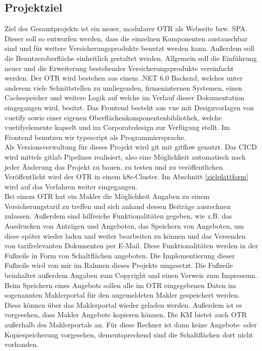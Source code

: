 \subsection{Projektziel}
\label{projektziel}
Ziel des Gesamtprojekts ist ein neuer, modularer \ac{OTR} als Webseite bzw. \ac{SPA}. Dieser soll so entworfen werden, dass die einzelnen Komponenten austauschbar sind und für weitere Versicherungsprodukte benutzt werden kann. Außerdem soll die Benutzeroberfläche einheitlich gestaltet werden. Allgemein soll die Einführung neuer und die Erweiterung bestehender Versicherungsprodukte vereinfacht werden. Der \ac{OTR} wird bestehen aus einem .NET 6.0 Backend, welches unter anderem viele Schnittstellen zu umliegenden, firmeninternen Systemen, einen Cachespeicher und weitere Logik auf welche im Verlauf dieser Dokumentation eingegangen wird, besitzt. Das Frontend besteht aus \gls{vue} mit Designvorlagen von \gls{vuetify} sowie einer eigenen Oberflächenkomponentenbibliothek, welche \gls{vuetify}elemente kapselt und im Corporatedesign zur Verfügung stellt. Im Frontend benutzen wir \gls{typescript} als Programmiersprache.\\
Als Versionsverwaltung für dieses Projekt wird \gls{git} mit \gls{gitflow} genutzt. Das \ac{CICD} wird mittels \gls{gitlab} Pipelines realisiert, also eine Möglichkeit automatisch nach jeder Änderung das Projekt zu bauen, zu testen und zu veröffentlichen. Veröffentlicht wird der \ac{OTR} in einem \gls{k8s}-Cluster. Im Abschnitt \ref{zielplattform} wird auf das Verfahren weiter eingegangen.
\\
Bei einem \ac{OTR} hat ein Makler die Möglichkeit Angaben zu einem Versicherungstarif zu treffen und sich anhand dessen Beiträge ausrechnen zulassen. Außerdem sind hilfreiche Funktionalitäten gegeben, wie z.B. das Ausdrucken von Anträgen und Angeboten, das Speichern von Angeboten, um diese später wieder laden und weiter bearbeiten zu können und das Versenden von tarifrelevanten Dokumenten per E-Mail. Diese Funktionalitäten werden in der Fußzeile in Form von Schaltflächen angeboten. Die Implementierung dieser Fußzeile wird von mir im Rahmen dieses Projekts umgesetzt. Die Fußzeile beinhaltet außerdem Angaben zum Copyright und einen Verweis zum Impressum.
\\

Beim Speichern eines Angebots sollen alle im \ac{OTR} eingegebenen Daten im sogenannten Maklerportal für den angemeldeten Makler gespeichert werden. Diese können über das Maklerportal wieder geladen werden. Außerdem ist es vorgesehen, dass Makler Angebote kopieren können.
Die \ac{KM} bietet auch \ac{OTR} außerhalb des Maklerportals an. Für diese Rechner ist dann keine Angebots- oder Kopiespeicherung vorgesehen, dementsprechend sind die Schaltflächen dort nicht vorhanden. \\

